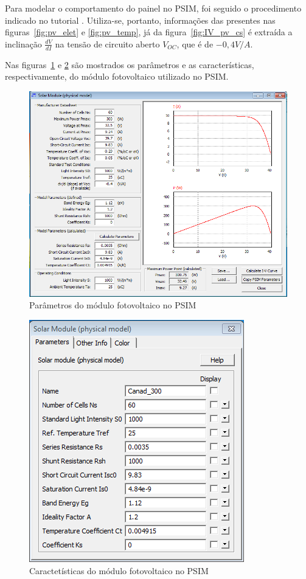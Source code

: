 \documentclass[
	12pt,				%
	openright,			%
	onseside,
	a4paper,			%
	english,			%
	french,				%
	spanish,			%
	brazil,				%
	]{abntex2}
\begin{document}
Para modelar o comportamento do painel no PSIM, foi seguido o procedimento indicado no tutorial \cite{PSIM_PV}. Utiliza-se, portanto, informações das presentes nas figuras~\ref{fig:pv_elet} e \ref{fig:pv_temp}, já da figura~\ref{fig:IV_pv_cs} é extraída a inclinação $\frac{dV}{dI}$ na tensão de circuito aberto $V_{OC}$, que é de $-0,4 V/A$.

Nas figuras~\ref{fig:pv_psim_param} e \ref{fig:pv_psim_carac} são mostrados os parâmetros e as características, respectivamente, do módulo fotovoltaico utilizado no PSIM.

\begin{figure}[]%
	\begin{center}%
		\includegraphics[width=0.55 \linewidth]{PV_param}
		\caption{Parâmetros do módulo fotovoltaico no PSIM}
		\label{fig:pv_psim_param}
	\end{center}
\end{figure}

\begin{figure}[]%
	\begin{center}%
		\includegraphics[width=0.55 \linewidth]{PV_carac}
		\caption{Caractetísticas do módulo fotovoltaico no PSIM}
		\label{fig:pv_psim_carac}
	\end{center}
\end{figure}
\end{document}
